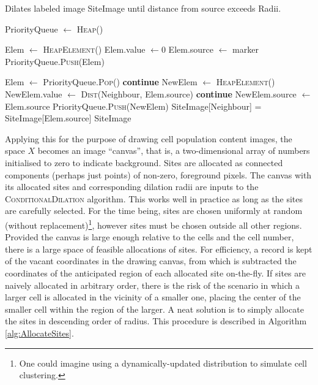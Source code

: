 \begin{algorithm}
\caption{Dilates labeled image SiteImage until distance from source exceeds Radii.} \label{alg:ConditionalDilation}
\begin{algorithmic}[1]

\State PriorityQueue $\leftarrow$ \textsc{Heap}()

    \State Elem $\leftarrow$ \textsc{HeapElement}()
    \State Elem.value $\leftarrow 0$ 
    \State Elem.source $\leftarrow$ marker 
    \State PriorityQueue.\textsc{Push}(Elem)
\EndFor

    \State Elem $\leftarrow$ PriorityQueue.\textsc{Pop}()
            \State \textbf{continue} 
        \EndIf
        \State NewElem $\leftarrow$ \textsc{HeapElement}()
        \State NewElem.value $\leftarrow$ \textsc{Dist}(Neighbour, Elem.source)
            \State \textbf{continue} 
        \EndIf
        \State NewElem.source $\leftarrow$ Elem.source
        \State PriorityQueue.\textsc{Push}(NewElem)
        \State SiteImage[Neighbour] = SiteImage[Elem.source]
    \EndFor
\EndWhile
\State\Return SiteImage
\EndProcedure
\end{algorithmic}
\end{algorithm}

Applying this for the purpose of drawing cell population content images, the space $X$ becomes an image ``canvas'', that is, a two-dimensional array of numbers initialised to zero to indicate background. Sites are allocated as connected components (perhaps just points) of non-zero, foreground pixels. The canvas with its allocated sites and corresponding dilation radii are inputs to the \textsc{ConditionalDilation} algorithm. This works well in practice as long as the sites are carefully selected. For the time being, sites are chosen uniformly at random (without replacement)\footnote{One could imagine using a dynamically-updated distribution to simulate cell clustering.}, however sites must be chosen outside all other regions. Provided the canvas is large enough relative to the cells and the cell number, there is a large space of feasible allocations of sites. For efficiency, a record is kept of the vacant coordinates in the drawing canvas, from which is subtracted the coordinates of the anticipated region of each allocated site on-the-fly. If sites are naively allocated in arbitrary order, there is the risk of the scenario in which a larger cell is allocated in the vicinity of a smaller one, placing the center of the smaller cell within the region of the larger. A neat solution is to simply allocate the sites in descending order of radius. This procedure is described in Algorithm \ref{alg:AllocateSites}.


